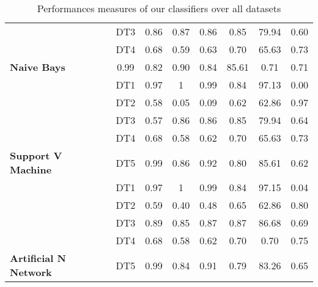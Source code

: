 \begin{table}[h]
\begin{tabular}{|l|c|c|c|c|c|c|c|}
  \cline{2-8}
  &DT3 &0.86 &0.87 &0.86&0.85&79.94&0.60\\
  \cline{2-8}
  &DT4 &0.68 &0.59&0.63&0.70&65.63&0.73\\
  \cline{2-8}
\multirow{-4}{*}{ \textbf{Naive Bays}}&0.99 &0.82&0.90&0.84&85.61&0.71&0.71\\
\hline
\cline{2-8}
&DT1 &0.97 &1   &0.99 &0.84 &97.13&0.00 \\
\cline{2-8}
  &DT2 &0.58  &0.05   & 0.09&0.62&62.86&0.97\\
  \cline{2-8}
  &DT3 &0.57 & 0.86&0.86&0.85&79.94&0.64\\
  \cline{2-8}
 & DT4 & 0.68&0.58&0.62&0.70&65.63&0.73\\
 \cline{2-8}
 \multirow{-4}{*}{ \textbf{Support V Machine}}& DT5 &0.99 &0.86&0.92&0.80&85.61&0.62\\
 \hline
\cline{2-8}
&DT1 &0.97&1 &0.99   &0.84 &97.15&0.04  \\
\cline{2-8}
&  DT2 &0.59  &0.40   &0.48&0.65&62.86&0.80 \\
\cline{2-8}
 & DT3 &0.89 &0.85 &0.87&0.87&86.68&0.69\\
 \cline{2-8}
 & DT4 &0.68 &0.58&0.62&0.70&0.70&0.75\\
  \cline{2-8}
  \multirow{-4}{*}{ \textbf{ Artificial N Network}}&DT5 &0.99 &0.84&0.91&0.79&83.26&0.65\\ 
  \hline
\end{tabular}
\caption{Performances measures of our classifiers over all datasets}\label{raw_data1}
\end{table}